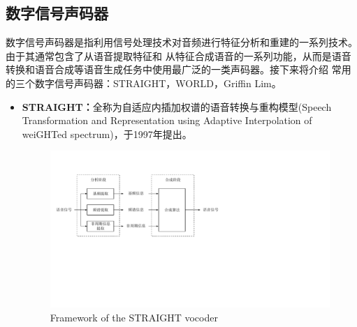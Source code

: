 \subsection{数字信号声码器}
数字信号声码器是指利用信号处理技术对音频进行特征分析和重建的一系列技术。由于其通常包含了从语音提取特征和
从特征合成语音的一系列功能，从而是语音转换和语音合成等语音生成任务中使用最广泛的一类声码器。接下来将介绍
常用的三个数字信号声码器：STRAIGHT，WORLD，Griffin Lim。

\begin{itemize}
    \item \textbf{STRAIGHT：}全称为自适应内插加权谱的语音转换与重构模型(Speech Transformation
    and Representation using Adaptive Interpolation of weiGHTed spectrum)，于1997年提出\cite{kawahara1997speech}。

    \begin{figure}[!htp]
        \centering
        \includegraphics[width=13cm,trim=10 180 280 60,clip]{figure/2_vocoder.pdf}
        {Framework of the STRAIGHT vocoder}
        \label{fig:vocoder}
    \end{figure}


\end{itemize}
